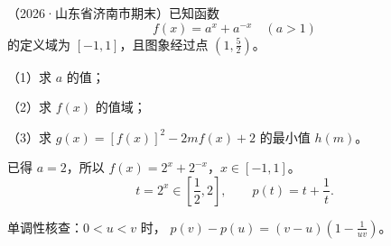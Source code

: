 
\begin{frame}[t,label=B14q]
  （2026·山东省济南市期末）已知函数
  \[
    f(x)=a^x+a^{-x}\quad(a>1)
  \]
  的定义域为 $[-1,1]$，且图象经过点 $\left(1,\frac52\right)$。
  \par（1）求 $a$ 的值；
  \par（2）求 $f(x)$ 的值域；
  \par（3）求 $g(x)=[f(x)]^2-2mf(x)+2$ 的最小值 $h(m)$。
  \pause
\end{frame}

\begin{frame}[t,label=B14a]
  已得 $a=2$，所以 $f(x)=2^x+2^{-x}$，$x\in[-1,1]$。
  \[
    t=2^x\in\left[\frac12,2\right],\qquad
    p(t)=t+\frac1t.
  \]
  \pause
  \par\vspace{0.2cm}
  单调性核查：$0<u<v$ 时，
  $p(v)-p(u)=(v-u)\left(1-\frac1{uv}\right)$。
\end{frame}

